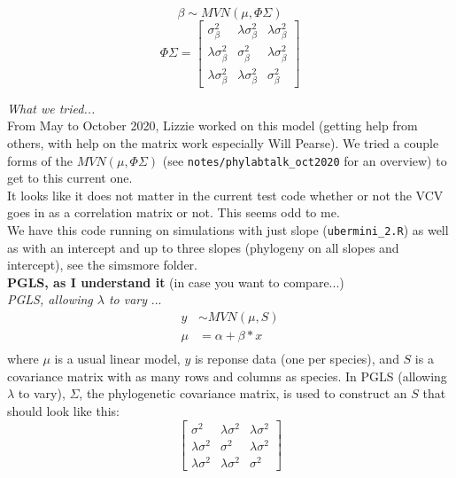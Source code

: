 \documentclass[11pt,letter]{article}
\begin{document}
\begin{equation*}
\beta \sim MVN(\mu, \Phi\Sigma)
\end{equation*}
\begin{equation*}
\Phi\Sigma = 
 \begin{bmatrix}
  \sigma^2_{\beta} &  \lambda \sigma^2_{\beta} & \lambda \sigma^2_{\beta} \\
  \lambda \sigma^2_{\beta}  & \sigma^2_{\beta} & \lambda \sigma^2_{\beta} \\
  \lambda \sigma^2_{\beta} & \lambda \sigma^2_{\beta} &   \sigma^2_{\beta}
 \end{bmatrix}
\end{equation*}

\newpage
\emph{What we tried...}\\
From May to October 2020, Lizzie worked on this model (getting help from others, with help on the matrix work especially Will Pearse). We tried a couple forms of the $MVN(\mu, \Phi\Sigma)$ (see \verb|notes/phylabtalk_oct2020| for an overview) to get to this current one. \\

It looks like it does not matter in the current test code whether or not the VCV goes in as a correlation matrix or not. This seems odd to me. \\

We have this code running on simulations with just slope (\verb|ubermini_2.R|) as well as with an intercept and up to three slopes (phylogeny on all slopes and intercept), see the simsmore folder. \\

{\bf PGLS, as I understand it} (in case you want to compare...)\\

\emph{PGLS, allowing $\lambda$ to vary} ...\\

\begin{align}
y & \sim MVN(\mu, S)\\
\mu & = \alpha +  \beta*x \\
\end{align}
where $\mu$ is a usual linear model, $y$ is reponse data (one per species), and $S$ is a covariance matrix with as many rows and columns as species. In PGLS  (allowing $\lambda$ to vary), $\Sigma$, the phylogenetic covariance matrix, is used to construct an $S$ that should look like this:
\begin{equation}
 \begin{bmatrix}
  \sigma^2 &  \lambda \sigma^2 & \lambda \sigma^2 \\
  \lambda \sigma^2  & \sigma^2 & \lambda \sigma^2 \\
  \lambda \sigma^2 & \lambda \sigma^2 &   \sigma^2
 \end{bmatrix}
\end{equation}
\end{document}
